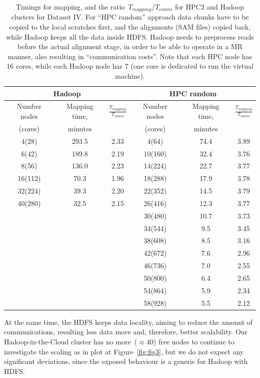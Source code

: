 \documentclass[11pt, oneside]{article}   	%
\begin{document}
\begin{table}[htdp]
\caption{Timings  for mapping, and the ratio~$T_{mapping}/T_{comm}$  for HPC2 and  Hadoop clusters for Dataset IV.
For ``HPC random'' approach data chunks have to be copied to the local scratches first, and  the alignments (SAM files) copied back, while Hadoop keeps all the data inside HDFS. Hadoop needs to preprocess reads before the actual alignment stage, in order  to be able to operate in a MR manner, also resulting in  ``communication costs''. Note that each HPC node has 16 cores, while each Hadoop node has 7 (one core is dedicated to run the virtual machine).}
\begin{center}
\begin{tabular}{|c|c|c|c|c|c|}
 \multicolumn{3}{|c|}{Hadoop} & \multicolumn{3}{c|}{ HPC random} \\
 \hline		


Number nodes	&Mapping time,	&$\frac{T_{mapping}}{T_{comm}}$	&Number  nodes	&Mapping time,	&$\frac{T_{mapping}}{T_{comm}}$\\
(cores)					&minutes		&							&(cores)			&minutes&\\
\hline
4(28)	&293.5	&2.33	&4(64)	&74.4	&3.89\\
6(42)	&189.8	&2.19	&10(160)	&32.4	&3.76\\
8(56)	&136.0	&2.23	&14(224)	&22.7	&3.77\\
16(112)	&70.3	&1.96	&18(288)	&17.9	&3.78\\
32(224)	&39.3	&2.20	&22(352)	&14.5	&3.79\\
40(280)	&32.5	&2.15	&26(416)	&12.3	&3.77\\
			&&&30(480)	&10.7	&3.73\\
			&&&34(544)	&9.5	&3.45\\
			&&&38(608)	&8.5	&3.16\\
			&&&42(672)	&7.6	&2.96\\
			&&&46(736)	&7.0	&2.55\\
			&&&50(800)	&6.4	&2.65\\
			&&&54(864)	&5.9	&2.34\\
			&&&58(928)	&5.5	&2.12\\

\end{tabular}
\end{center}
\label{table:4}
\end{table}%
 At the same time, the HDFS keeps data locality, aiming to reduce the amount of communications, resulting less data move and, therefore, better scalability.
Our Hadoop-in-the-Cloud cluster has no more~($\approx 40$) free nodes to continue to investigate the scaling as in plot at Figure~\ref{fig:fig3}, but we do not expect any significant deviations, since the exposed behaviour is a generic for Hadoop with HDFS.
\end{document}
